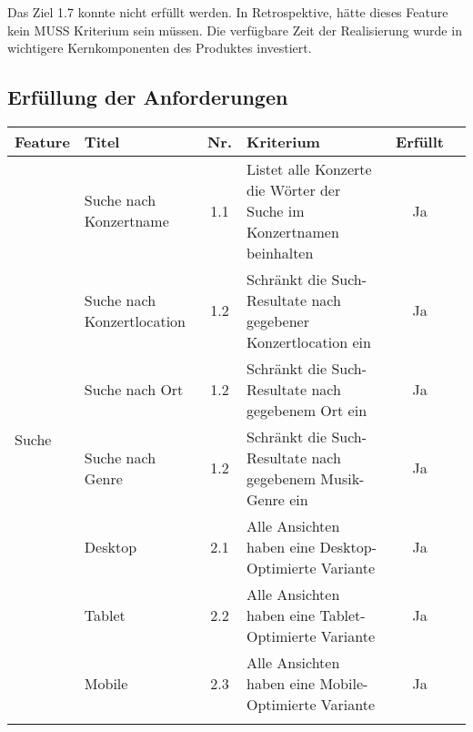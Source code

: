 Das Ziel 1.7 konnte nicht erfüllt werden. In Retrospektive, hätte dieses
Feature kein MUSS Kriterium sein müssen. Die verfügbare Zeit der Realisierung
wurde in wichtigere Kernkomponenten des Produktes investiert.

\clearpage
\subsection{Erfüllung der Anforderungen}

\begin{longtable}[]{@{}p{1.9cm}p{2.5cm}cp{5.5cm}cc@{}}
  \toprule
  \textbf{Feature}                & \textbf{Titel}             & \textbf{Nr.} & \textbf{Kriterium}                                                                                          & \textbf{Erfüllt}\tabularnewline
  \midrule
  \endhead
  \multirow{10}{*}{Suche}         & Suche nach Konzertname     & 1.1          & Listet alle Konzerte die Wörter der Suche im Konzertnamen beinhalten                                        & Ja                              \\ \cline{2-6}
                                  & Suche nach Konzertlocation & 1.2          & Schränkt die Such-Resultate nach gegebener Konzertlocation ein                                              & Ja                              \\ \cline{2-6}
                                  & Suche nach Ort             & 1.2          & Schränkt die Such-Resultate nach gegebenem Ort ein                                                          & Ja                              \\ \cline{2-6}
                                  & Suche nach Genre           & 1.2          & Schränkt die Such-Resultate nach gegebenem Musik-Genre ein                                                  & Ja                              \\
  \midrule
  \multirow{8}{*}{Design}         & Desktop                    & 2.1          & Alle Ansichten haben eine Desktop-Optimierte Variante                                                       & Ja                              \\ \cline{2-6}
                                  & Tablet                     & 2.2          & Alle Ansichten haben eine Tablet-Optimierte Variante                                                        & Ja                              \\ \cline{2-6}
                                  & Mobile                     & 2.3          & Alle Ansichten haben eine Mobile-Optimierte Variante                                                        & Ja                              \\ \cline{2-6}

\end{longtable}

